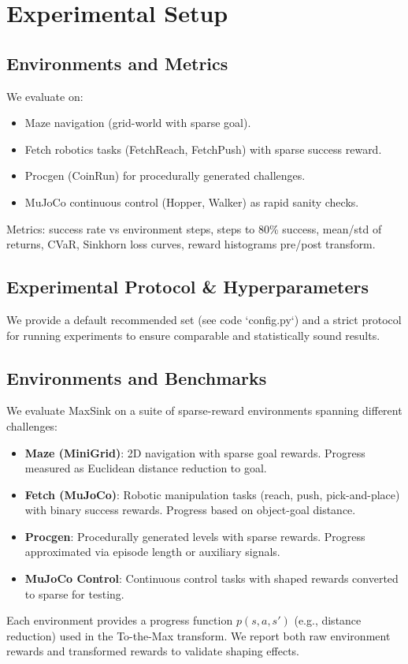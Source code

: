 \documentclass{article}
\begin{document}
\section{Experimental Setup}
\subsection{Environments and Metrics}
We evaluate on:
\begin{itemize}
  \item Maze navigation (grid-world with sparse goal).
  \item Fetch robotics tasks (FetchReach, FetchPush) with sparse success reward.
  \item Procgen (CoinRun) for procedurally generated challenges.
  \item MuJoCo continuous control (Hopper, Walker) as rapid sanity checks.
\end{itemize}
Metrics: success rate vs environment steps, steps to 80\% success, mean/std of returns, CVaR, Sinkhorn loss curves, reward histograms pre/post transform.

\subsection{Experimental Protocol \& Hyperparameters}
We provide a default recommended set (see code `config.py`) and a strict protocol for running experiments to ensure comparable and statistically sound results.

\subsection{Environments and Benchmarks}
We evaluate MaxSink on a suite of sparse-reward environments spanning different challenges:
\begin{itemize}
  \item \textbf{Maze (MiniGrid)}: 2D navigation with sparse goal rewards. Progress measured as Euclidean distance reduction to goal.
  \item \textbf{Fetch (MuJoCo)}: Robotic manipulation tasks (reach, push, pick-and-place) with binary success rewards. Progress based on object-goal distance.
  \item \textbf{Procgen}: Procedurally generated levels with sparse rewards. Progress approximated via episode length or auxiliary signals.
  \item \textbf{MuJoCo Control}: Continuous control tasks with shaped rewards converted to sparse for testing.
\end{itemize}
Each environment provides a progress function $p(s,a,s')$ (e.g., distance reduction) used in the To-the-Max transform. We report both raw environment rewards and transformed rewards to validate shaping effects.
\end{document}
